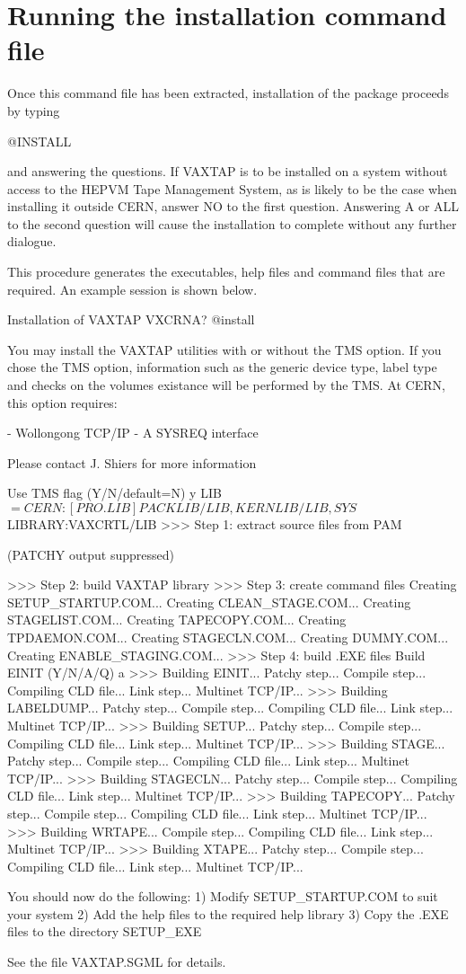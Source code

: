 \section{Running the installation command file}
\par
Once this command file has been extracted, installation of the package
proceeds by typing
\begin{XMP}
@INSTALL
\end{XMP}
and answering the questions. If VAXTAP is to be installed on a system
without access to the HEPVM Tape Management System, as is likely
to be the case when installing it outside CERN, answer NO to the first
question. Answering A or ALL to the second question will cause
the installation to complete without any further dialogue.
\par
This procedure generates the executables, help files and command
files that are required.
An example session is shown below.
\begin{XMPt}{Installation of VAXTAP}
VXCRNA? @install

You may install the VAXTAP utilities with or without the TMS option.
If you chose the TMS option, information such as the generic device
type, label type and checks on the volumes existance will be performed
by the TMS. At CERN, this option requires:

- Wollongong TCP/IP
- A SYSREQ interface

Please contact J. Shiers for more information

Use TMS flag       (Y/N/default=N) y
LIB$ = CERN:[PRO.LIB]PACKLIB/LIB,KERNLIB/LIB,SYS$LIBRARY:VAXCRTL/LIB
>>> Step 1: extract source files from PAM

(PATCHY output suppressed)

>>> Step 2: build VAXTAP library
>>> Step 3: create command files
Creating SETUP_STARTUP.COM...
Creating CLEAN_STAGE.COM...
Creating STAGELIST.COM...
Creating TAPECOPY.COM...
Creating TPDAEMON.COM...
Creating STAGECLN.COM...
Creating DUMMY.COM...
Creating ENABLE_STAGING.COM...
>>> Step 4: build .EXE files
Build EINIT       (Y/N/A/Q) a
>>> Building EINIT...
Patchy step...
Compile step...
Compiling CLD file...
Link step...
Multinet TCP/IP...
>>> Building LABELDUMP...
Patchy step...
Compile step...
Compiling CLD file...
Link step...
Multinet TCP/IP...
>>> Building SETUP...
Patchy step...
Compile step...
Compiling CLD file...
Link step...
Multinet TCP/IP...
>>> Building STAGE...
Patchy step...
Compile step...
Compiling CLD file...
Link step...
Multinet TCP/IP...
>>> Building STAGECLN...
Patchy step...
Compile step...
Compiling CLD file...
Link step...
Multinet TCP/IP...
>>> Building TAPECOPY...
Patchy step...
Compile step...
Compiling CLD file...
Link step...
Multinet TCP/IP...
>>> Building WRTAPE...
Compile step...
Compiling CLD file...
Link step...
Multinet TCP/IP...
>>> Building XTAPE...
Patchy step...
Compile step...
Compiling CLD file...
Link step...
Multinet TCP/IP...

You should now do the following:
 1) Modify SETUP_STARTUP.COM to suit your system
 2) Add the help files to the required help library
 3) Copy the .EXE files to the directory SETUP_EXE

See the file VAXTAP.SGML for details.
\end{XMPt}
